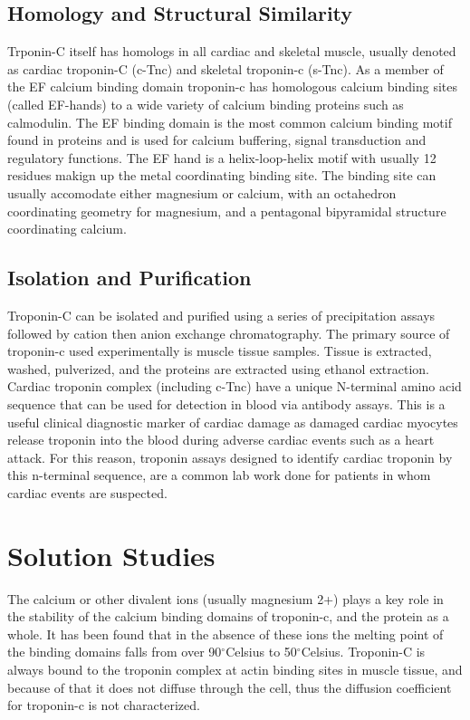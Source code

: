 \documentclass[12pt]{article}
\newcommand{\degrees}{{$^{\circ}$}}
\begin{document}
	\subsection{Homology and Structural Similarity}
	Trponin-C itself has homologs in all cardiac and skeletal muscle, usually denoted as cardiac troponin-C (c-Tnc) and skeletal troponin-c (s-Tnc). As a member of the EF calcium binding domain troponin-c has homologous calcium binding sites (called EF-hands) to a wide variety of calcium binding proteins such as calmodulin. The EF binding domain is the most common calcium binding motif found in proteins and is used for calcium buffering, signal transduction and regulatory functions.\cite{Lewit-Bentley2000} The EF hand is a helix-loop-helix motif with usually 12 residues makign up the metal coordinating binding site. The binding site can usually accomodate either magnesium or calcium, with an octahedron coordinating geometry for magnesium, and a pentagonal bipyramidal structure coordinating calcium.\cite{Lewit-Bentley2000}
	
	\subsection{Isolation and Purification}
	Troponin-C can be isolated and purified using a series of precipitation assays followed by cation then anion exchange chromatography.\cite{Greaser1973,Greaser1971,Strasburg1980} The primary source of troponin-c used experimentally is muscle tissue samples. Tissue is extracted, washed, pulverized, and the proteins are extracted using ethanol extraction.\cite{Greaser1973,Greaser1971,Strasburg1980} Cardiac troponin complex (including c-Tnc) have a unique N-terminal amino acid sequence that can be used for detection in blood via antibody assays. This is a useful clinical diagnostic marker of cardiac damage as damaged cardiac myocytes release troponin into the blood during adverse cardiac events such as a heart attack. For this reason, troponin assays designed to identify cardiac troponin by this n-terminal sequence, are a common lab work done for patients in whom cardiac events are suspected.\cite{Melanson2007}
	
	\section{Solution Studies}
	The calcium or other divalent ions (usually magnesium 2+) plays a key role in the stability of the calcium binding domains of troponin-c, and the protein as a whole. It has been found that in the absence of these ions the melting point of the binding domains falls from over 90\degrees Celsius to 50\degrees Celsius.\cite{Brzeska1983} Troponin-C is always bound to the troponin complex at actin binding sites in muscle tissue, and because of that it does not diffuse through the cell, thus the diffusion coefficient for troponin-c is not characterized.
	
\end{document}
